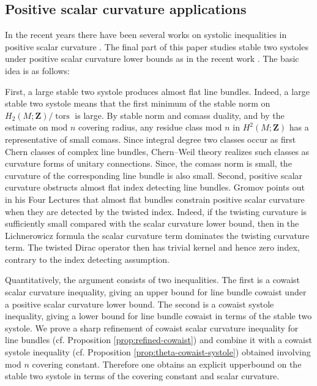 \documentclass[11pt,reqno]{amsart}
\numberwithin{equation}{section}
\numberwithin{equation}{section}
\theoremstyle{definition}
\newcommand{\Z}{\mathbf Z}
\DeclareMathOperator{\tors}{tors}
\begin{document}
\subsection{Positive scalar curvature applications} In the recent years there have been several works on systolic inequalities in positive scalar curvature \cite{richard,zhu,xu,Sha2026,Orikasa2025}.  The final part of this paper studies stable two systoles under positive scalar curvature lower bounds as in the recent work \cite{Stryker}. The basic idea is as follows:

First, a large stable two systole produces almost flat line bundles. Indeed, a large stable two systole means that the first minimum of the stable norm on \(H_2(M;\Z)/\tors\) is large. By stable norm and comass duality, and by the estimate on mod $n$ covering radius, any residue class mod \(n\) in \(H^2(M;\Z)\) has a representative of small comass. Since integral degree two classes occur as first Chern classes of complex line bundles, Chern--Weil theory realizes such classes as curvature forms of unitary connections. Since, the comass norm is small, the curvature of the corresponding line bundle is also small. 
Second, positive scalar curvature obstructs almost flat index detecting line bundles. Gromov points out in his Four Lectures \cite[Section 3.14.1]{four} that almost flat bundles constrain positive scalar curvature when they are detected by the twisted index. Indeed, if the twisting curvature is sufficiently small compared with the scalar curvature lower bound, then in the Lichnerowicz formula the scalar curvature term dominates the twisting curvature term. The twisted Dirac operator then has trivial kernel and hence zero index, contrary to the index detecting assumption.

Quantitatively, the argument consists of two inequalities. The first is a cowaist scalar curvature inequality, giving an upper bound for line bundle cowaist under a positive scalar curvature lower bound. The second is a cowaist systole inequality, giving a lower bound for line bundle cowaist in terms of the stable two systole. We prove a sharp refinement of cowaist scalar curvature inequality for line bundles (cf. Proposition \ref{prop:refined-cowaist}) and combine it with a cowaist systole inequality (cf. Proposition \ref{prop:theta-cowaist-systole}) obtained involving mod \(n\) covering constant. Therefore one obtains an explicit upperbound on the stable two systole in terms of the covering constant and scalar curvature.
\end{document}
